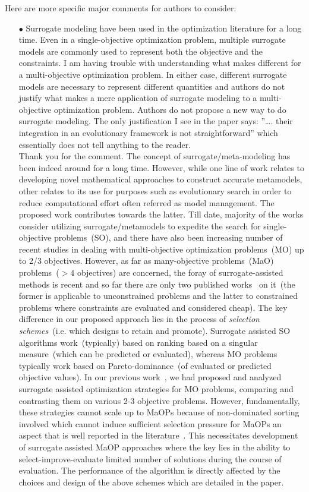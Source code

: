 \documentclass[onecolumn,10pt]{asme2ej}
\begin{document}
Here are more specific major comments for authors to consider: 
\begin{itemize}
\item[$\bullet$] Surrogate modeling have been used in the optimization literature for a long time. Even in a single-objective optimization problem, multiple surrogate models are commonly used to represent both the objective and the constraints. I am having trouble with understanding what makes different for a multi-objective optimization problem. In either case, different surrogate models are necessary to represent different quantities and authors do not justify what makes a mere application of surrogate modeling to a multi-objective optimization problem. Authors do not propose a new way to do surrogate modeling. The only justification I see in the paper says: ”…. their integration in an evolutionary framework is not straightforward” which essentially does not tell anything to the reader. \\

{\color{blue}
Thank you for the comment. The concept of surrogate/meta-modeling has been indeed around for a long time. However, while one line of work relates to developing novel mathematical approaches to construct accurate metamodels, other relates to its use for purposes such as evolutionary search in order to reduce computational effort often referred as model management. The proposed work contributes towards the latter. Till date, majority of the works consider utilizing surrogate/metamodels to expedite the search for single-objective problems~(SO), and there have also been increasing number of recent studies in dealing with multi-objective optimization problems~(MO) up to 2/3 objectives. However, as far as many-objective problems~(MaO) problems~($>4$ objectives) are concerned, the foray of surrogate-assisted methods is recent and so far there are only two published works~\cite{KHTchugh2016krvea,KHTchugh2016const} on it~(the former is applicable to unconstrained problems and the latter to constrained problems where constraints are evaluated and considered cheap). The key difference in our proposed approach lies in the process of \emph{selection schemes}~(i.e. which designs to retain and promote). Surrogate assisted SO algorithms work~(typically) based on ranking based on a singular measure~(which can be predicted or evaluated), whereas MO problems typically work based on Pareto-dominance~(of evaluated or predicted objective values). In our previous work~\cite{KHTjmd2016}, we had proposed and analyzed surrogate assisted optimization strategies for MO problems, comparing and contrasting them on various 2-3 objective problems. However, fundamentally, these strategies cannot scale up to MaOPs because of non-dominated sorting involved which cannot induce sufficient selection pressure for MaOPs an aspect that is well reported in the literature~\cite{ishibuchi2008evolutionary}. This necessitates development of surrogate assisted MaOP approaches where the key lies in the ability to select-improve-evaluate limited number of solutions during the course of evaluation. The performance of the algorithm is directly affected by the choices and design of the above schemes which are detailed in the paper.  \\
}



\end{itemize}
\end{document}
